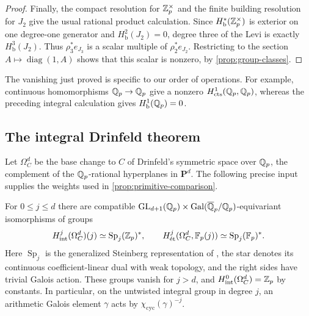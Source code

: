 \begin{proof}
Finally, the compact resolution for $\mathbb Z_p^\times$ and the finite
building resolution for $J_2$ give the usual rational product
calculation.  Since $H^*_{\mathrm b}(\mathbb Z_p^\times)$ is exterior
on one degree-one generator and $H^2_{\mathrm b}(J_2)=0$,
degree three of the Levi is exactly $H^3_{\mathrm b}(J_2)$.
Thus $\rho_3^*e_{J_3}$ is a scalar multiple of
$\rho_2^*e_{J_2}$.  Restricting to the section
$A\mapsto\operatorname{diag}(1,A)$ shows that this scalar is
nonzero, by \cref{prop:group-classes}.
\end{proof}

The vanishing just proved is specific to our order of operations.
For example, continuous homomorphisms $\mathbb Q_p\to\mathbb Q_p$ give a
nonzero $H^1_{\mathrm{cts}}(\mathbb Q_p,\mathbb Q_p)$, whereas the preceding integral
calculation gives $H^1_{\mathrm b}(\mathbb Q_p)=0$.

\subsection{The integral Drinfeld theorem}

Let $\Omega_C^d$ be the base change to $C$ of Drinfeld's symmetric
space over $\mathbb Q_p$, the complement of the $\mathbb Q_p$-rational
hyperplanes in $\mathbf P^d$.  The following precise input supplies
the weights used in \cref{prop:primitive-comparison}.

\begin{theorem}
\label{thm:drinfeld}
For $0\leq j\leq d$ there are compatible
$\operatorname{GL}_{d+1}(\mathbb Q_p)\times\operatorname{Gal}(\overline{\mathbb Q}_p/\mathbb Q_p)$-equivariant
isomorphisms of groups
\[
 H^j_{\mathrm{int}}(\Omega_C^d)(j)
       \simeq\operatorname{Sp}_j(\mathbb Z_p)^*,
 \qquad
 H^j_{\mathrm{\acute et}}(\Omega_C^d,\mathbb F_p(j))
       \simeq\operatorname{Sp}_j(\mathbb F_p)^*.
\]
Here $\operatorname{Sp}_j$ is the generalized Steinberg
representation of \cite[\S4.1]{CDN2021}, the star denotes its
continuous coefficient-linear dual with weak topology, and
the right sides have trivial Galois action.  These groups vanish
for $j>d$, and $H^0_{\mathrm{int}}(\Omega_C^d)=\mathbb Z_p$ by constants.
In particular, on the untwisted integral group in degree $j$,
an arithmetic Galois element $\gamma$ acts by
$\chi_{\mathrm{cyc}}(\gamma)^{-j}$.
\end{theorem}

